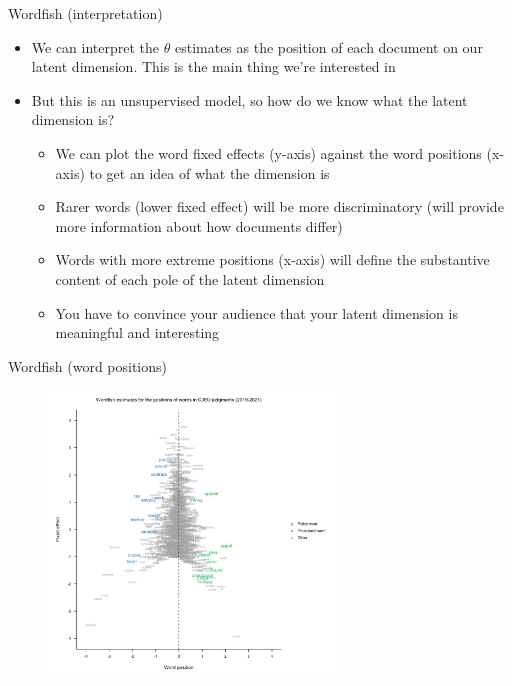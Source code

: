 \documentclass[pdf, 9pt, fleqn, handout]{beamer}
\begin{document}
\begin{frame}{Wordfish (interpretation)}
\begin{itemize}
\item We can interpret the $\theta$ estimates as the position of each document on our latent dimension. This is the main thing we're interested in \\[1em]
\item But this is an unsupervised model, so how do we know what the latent dimension is? \\[0.5em]
\begin{itemize}
\item We can plot the word fixed effects (y-axis) against the word positions (x-axis) to get an idea of what the dimension is \\[1em]
\item Rarer words (lower fixed effect) will be more discriminatory (will provide more information about how documents differ) \\[1em]
\item Words with more extreme positions (x-axis) will define the substantive content of each pole of the latent dimension \\[1em]
\item You have to convince your audience that your latent dimension is meaningful and interesting
\end{itemize}
\end{itemize}
\end{frame}

\begin{frame}{Wordfish (word positions)}
\begin{figure}
\centering
\includegraphics[width = 3in]{word_positions}
\end{figure}
\end{frame}
\end{document}
